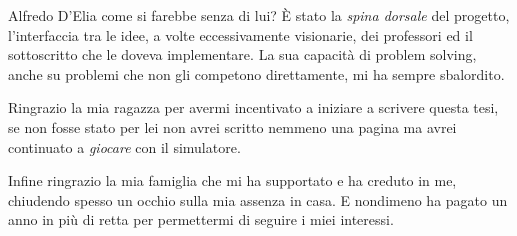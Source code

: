 Alfredo D'Elia come si farebbe senza di lui? È stato la \emph{spina dorsale} del progetto, l'interfaccia tra le idee, a volte eccessivamente visionarie, dei professori ed il sottoscritto che le doveva implementare. La sua capacità di problem solving, anche su problemi che non gli competono direttamente, mi ha sempre sbalordito.

Ringrazio la mia ragazza per avermi incentivato a iniziare a scrivere questa tesi, se non fosse stato per lei non avrei scritto nemmeno una pagina ma avrei continuato a \emph{giocare} con il simulatore.

Infine ringrazio la mia famiglia che mi ha supportato e ha creduto in me, chiudendo spesso un occhio sulla mia assenza in casa. E nondimeno ha pagato un anno in più di retta per permettermi di seguire i miei interessi.











